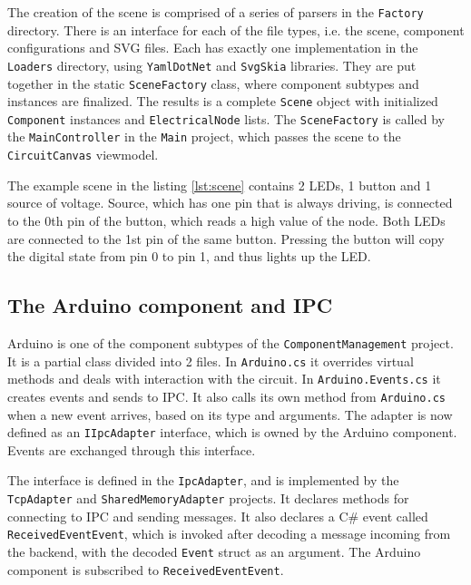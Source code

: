 The creation of the scene is comprised of a series of parsers in the \texttt{Factory} directory. There is an interface for each of the file types, i.e. the scene, component configurations and SVG files. Each has exactly one implementation in the \texttt{Loaders} directory, using \texttt{YamlDotNet} and \texttt{SvgSkia} libraries. They are put together in the static \texttt{SceneFactory} class, where component subtypes and instances are finalized. The results is a complete \texttt{Scene} object with initialized \texttt{Component} instances and \texttt{ElectricalNode} lists. The \texttt{SceneFactory} is called by the \texttt{MainController} in the \texttt{Main} project, which passes the scene to the \texttt{CircuitCanvas} viewmodel.



The example scene in the listing \ref{lst:scene} contains 2 LEDs, 1 button and 1 source of voltage. Source, which has one pin that is always driving, is connected to the 0th pin of the button, which reads a high value of the node. Both LEDs are connected to the 1st pin of the same button. Pressing the button will copy the digital state from pin 0 to pin 1, and thus lights up the LED.

\subsection{The Arduino component and IPC}

Arduino is one of the component subtypes of the \texttt{ComponentManagement} project. It is a partial class divided into 2 files. In \texttt{Arduino.cs} it overrides virtual methods and deals with interaction with the circuit. In \texttt{Arduino.Events.cs} it creates events and sends to IPC. It also calls its own method from \texttt{Arduino.cs} when a new event arrives, based on its type and arguments. The adapter is now defined as an \texttt{IIpcAdapter} interface, which is owned by the Arduino component. Events are exchanged through this interface.

The interface is defined in the \texttt{IpcAdapter}, and is implemented by the \texttt{TcpAdapter} and \texttt{SharedMemoryAdapter} projects. It declares methods for connecting to IPC and sending messages. It also declares a C\# event called \texttt{ReceivedEventEvent}, which is invoked after decoding a message incoming from the backend, with the decoded \texttt{Event} struct as an argument. The Arduino component is subscribed to \texttt{ReceivedEventEvent}.

